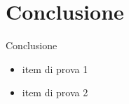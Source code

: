 \chapter{Conclusione}
Conclusione
\begin{itemize}
 \item item di prova 1
 \item item di prova 2
\end{itemize}
